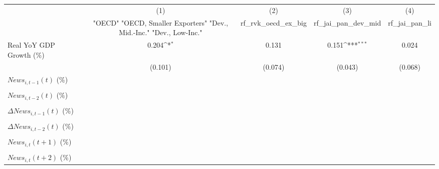 {
\def\sym#1{\ifmmode^{#1}\else\(^{#1}\)\fi}
\begin{tabular}{l*{4}{c}}
\toprule
                    &\multicolumn{1}{c}{(1)}&\multicolumn{1}{c}{(2)}&\multicolumn{1}{c}{(3)}&\multicolumn{1}{c}{(4)}\\
                    &\multicolumn{1}{c}{ "OECD" "OECD, Smaller Exporters" "Dev., Mid.-Inc." "Dev., Low-Inc."}&\multicolumn{1}{c}{rf_rvk_oecd_ex_big}&\multicolumn{1}{c}{rf_jai_pan_dev_mid}&\multicolumn{1}{c}{rf_jai_pan_li}\\
\midrule
Real YoY GDP Growth (\%)&       0.204\sym{*}  &       0.131         &       0.151\sym{***}&       0.024         \\
                    &     (0.101)         &     (0.074)         &     (0.043)         &     (0.068)         \\
\addlinespace
$ News_{i,t-1}(t)$ (\%)&                     &                     &                     &                     \\
                    &                     &                     &                     &                     \\
\addlinespace
$ News_{i,t-2}(t)$ (\%)&                     &                     &                     &                     \\
                    &                     &                     &                     &                     \\
\addlinespace
$ \Delta News_{i,t-1}(t)$ (\%)&                     &                     &                     &                     \\
                    &                     &                     &                     &                     \\
\addlinespace
$ \Delta News_{i,t-2}(t)$ (\%)&                     &                     &                     &                     \\
                    &                     &                     &                     &                     \\
\addlinespace
$ News_{i,t}(t+1)$ (\%)&                     &                     &                     &                     \\
                    &                     &                     &                     &                     \\
\addlinespace
$ News_{i,t}(t+2)$ (\%)&                     &                     &                     &                     \\

\end{tabular}}
